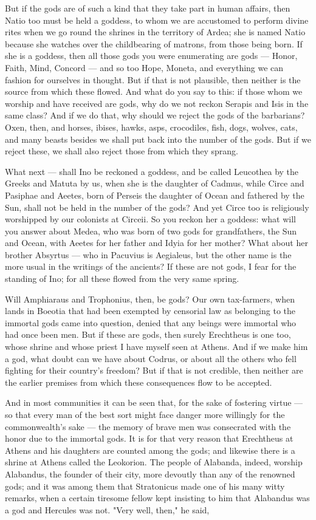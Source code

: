  But if the gods are of such a kind that they take part in human affairs, then Natio too must be held a goddess, to whom we are accustomed to perform divine rites when we go round the shrines in the territory of Ardea; she is named Natio because she watches over the childbearing of matrons, from those being born. If she is a goddess, then all those gods you were enumerating are gods — Honor, Faith, Mind, Concord — and so too Hope, Moneta, and everything we can fashion for ourselves in thought. But if that is not plausible, then neither is the source from which these flowed. And what do you say to this: if those whom we worship and have received are gods, why do we not reckon Serapis and Isis in the same class? And if we do that, why should we reject the gods of the barbarians? Oxen, then, and horses, ibises, hawks, asps, crocodiles, fish, dogs, wolves, cats, and many beasts besides we shall put back into the number of the gods. But if we reject these, we shall also reject those from which they sprang.

 What next — shall Ino be reckoned a goddess, and be called Leucothea by the Greeks and Matuta by us, when she is the daughter of Cadmus, while Circe and Pasiphae and Aeetes, born of Perseis the daughter of Ocean and fathered by the Sun, shall not be held in the number of the gods? And yet Circe too is religiously worshipped by our colonists at Circeii. So you reckon her a goddess: what will you answer about Medea, who was born of two gods for grandfathers, the Sun and Ocean, with Aeetes for her father and Idyia for her mother? What about her brother Absyrtus — who in Pacuvius is Aegialeus, but the other name is the more usual in the writings of the ancients? If these are not gods, I fear for the standing of Ino; for all these flowed from the very same spring.

 Will Amphiaraus and Trophonius, then, be gods? Our own tax-farmers, when lands in Boeotia that had been exempted by censorial law as belonging to the immortal gods came into question, denied that any beings were immortal who had once been men. But if these are gods, then surely Erechtheus is one too, whose shrine and whose priest I have myself seen at Athens. And if we make him a god, what doubt can we have about Codrus, or about all the others who fell fighting for their country's freedom? But if that is not credible, then neither are the earlier premises from which these consequences flow to be accepted.

 And in most communities it can be seen that, for the sake of fostering virtue — so that every man of the best sort might face danger more willingly for the commonwealth's sake — the memory of brave men was consecrated with the honor due to the immortal gods. It is for that very reason that Erechtheus at Athens and his daughters are counted among the gods; and likewise there is a shrine at Athens called the Leokorion. The people of Alabanda, indeed, worship Alabandus, the founder of their city, more devoutly than any of the renowned gods; and it was among them that Stratonicus made one of his many witty remarks, when a certain tiresome fellow kept insisting to him that Alabandus was a god and Hercules was not. "Very well, then," he said,

